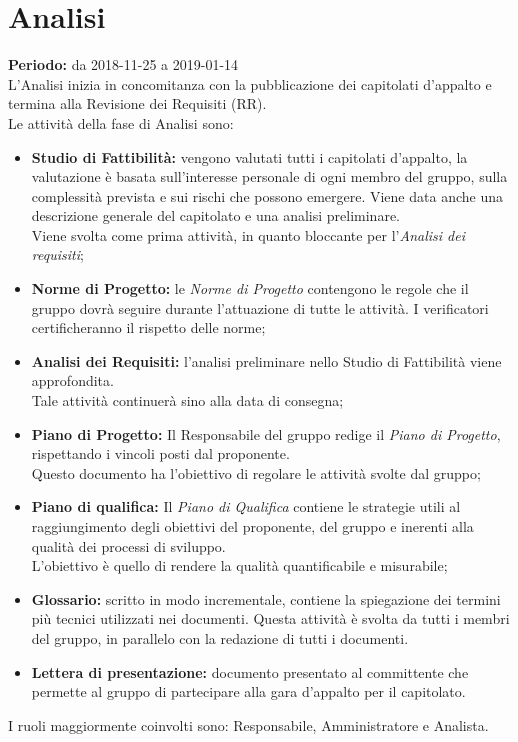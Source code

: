 \section{Analisi}
\textbf{Periodo:} da 2018-11-25 a 2019-01-14\\L'Analisi inizia in concomitanza con la pubblicazione dei capitolati d’appalto e termina alla Revisione dei Requisiti (RR).\\
Le attività della fase di Analisi sono:
\begin{itemize}
    \item \textbf{Studio di Fattibilità:} vengono valutati tutti i capitolati d'appalto, la valutazione è basata sull'interesse personale di ogni membro del gruppo, sulla complessità prevista e sui rischi che possono emergere. Viene data anche una descrizione generale del capitolato e una analisi preliminare.\\Viene svolta come prima attività, in quanto bloccante per l'\textit{Analisi dei requisiti};
    \item \textbf{Norme di Progetto:} le \textit{Norme di Progetto} contengono le regole che il gruppo dovrà seguire durante l'attuazione di tutte le attività. I verificatori certificheranno il rispetto delle norme;
    \item \textbf{Analisi dei Requisiti:} l'analisi preliminare nello Studio di Fattibilità viene approfondita.\\Tale attività continuerà sino alla data di consegna;
    \item \textbf{Piano di Progetto:} Il Responsabile del gruppo redige il \textit{Piano di Progetto}, rispettando i vincoli posti dal proponente.\\Questo documento ha l'obiettivo di regolare le attività svolte dal gruppo;
    \item \textbf{Piano di qualifica:} Il \textit{Piano di Qualifica} contiene le strategie utili al raggiungimento degli obiettivi del proponente, del gruppo e inerenti alla qualità dei processi di sviluppo.\\L'obiettivo è quello di rendere la qualità quantificabile e misurabile;
    \item \textbf{Glossario:} scritto in modo incrementale, contiene la spiegazione dei termini più tecnici utilizzati nei documenti. Questa attività è svolta da tutti i membri del gruppo, in parallelo con la redazione di tutti i documenti.
    \item \textbf{Lettera di presentazione:} documento presentato al committente che permette al gruppo di partecipare alla gara d’appalto per il capitolato.
\end{itemize}
I ruoli maggiormente coinvolti sono: Responsabile, Amministratore e Analista.
